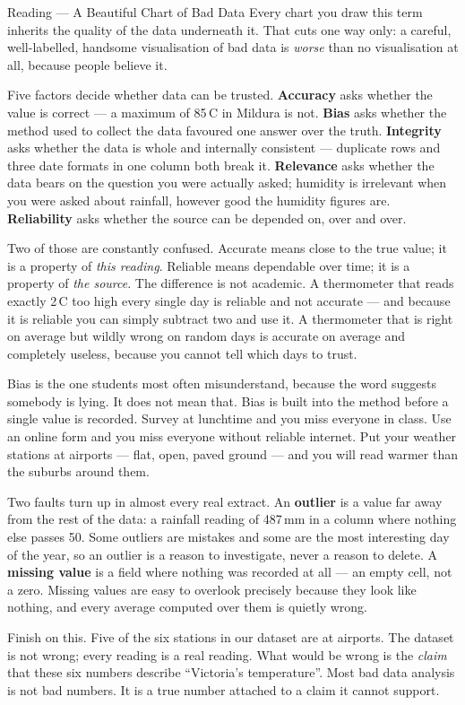 \documentclass[11pt,a4paper]{article}
\begin{document}
\begin{readingbox}{Reading --- A Beautiful Chart of Bad Data}
Every chart you draw this term inherits the quality of the data underneath it. That cuts one way only: a careful, well-labelled, handsome visualisation of bad data is \emph{worse} than no visualisation at all, because people believe it.

Five factors decide whether data can be trusted. \textbf{Accuracy} asks whether the value is correct --- a maximum of 85\,\textdegree C in Mildura is not. \textbf{Bias} asks whether the method used to collect the data favoured one answer over the truth. \textbf{Integrity} asks whether the data is whole and internally consistent --- duplicate rows and three date formats in one column both break it. \textbf{Relevance} asks whether the data bears on the question you were actually asked; humidity is irrelevant when you were asked about rainfall, however good the humidity figures are. \textbf{Reliability} asks whether the source can be depended on, over and over.

Two of those are constantly confused. Accurate means close to the true value; it is a property of \emph{this reading}. Reliable means dependable over time; it is a property of \emph{the source}. The difference is not academic. A thermometer that reads exactly 2\,\textdegree C too high every single day is reliable and not accurate --- and because it is reliable you can simply subtract two and use it. A thermometer that is right on average but wildly wrong on random days is accurate on average and completely useless, because you cannot tell which days to trust.

Bias is the one students most often misunderstand, because the word suggests somebody is lying. It does not mean that. Bias is built into the method before a single value is recorded. Survey at lunchtime and you miss everyone in class. Use an online form and you miss everyone without reliable internet. Put your weather stations at airports --- flat, open, paved ground --- and you will read warmer than the suburbs around them.

Two faults turn up in almost every real extract. An \textbf{outlier} is a value far away from the rest of the data: a rainfall reading of 487\,mm in a column where nothing else passes 50. Some outliers are mistakes and some are the most interesting day of the year, so an outlier is a reason to investigate, never a reason to delete. A \textbf{missing value} is a field where nothing was recorded at all --- an empty cell, not a zero. Missing values are easy to overlook precisely because they look like nothing, and every average computed over them is quietly wrong.

Finish on this. Five of the six stations in our dataset are at airports. The dataset is not wrong; every reading is a real reading. What would be wrong is the \emph{claim} that these six numbers describe ``Victoria's temperature''. Most bad data analysis is not bad numbers. It is a true number attached to a claim it cannot support.
\end{readingbox}
\end{document}
